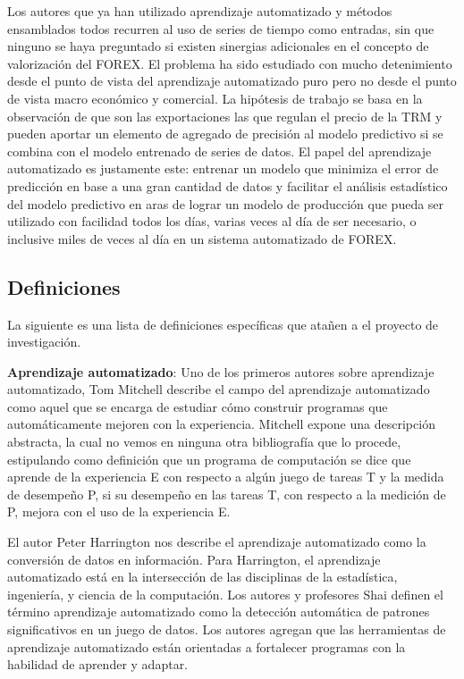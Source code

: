 Los autores que ya han utilizado aprendizaje automatizado y métodos ensamblados todos recurren al uso de series de tiempo como entradas, sin que ninguno se haya preguntado si existen sinergias adicionales en el concepto de valorización del FOREX. El problema ha sido estudiado con mucho detenimiento desde el punto de vista del aprendizaje automatizado puro pero no desde el punto de vista macro económico y comercial. La hipótesis de trabajo se basa en la observación de que son las exportaciones las que regulan el precio de la TRM y pueden aportar un elemento de agregado de precisión al modelo predictivo si se combina con el modelo entrenado de series de datos. El papel del aprendizaje automatizado es justamente este: entrenar un modelo que minimiza el error de predicción en base a una gran cantidad de datos y facilitar el análisis estadístico del modelo predictivo en aras de lograr un modelo de producción que pueda ser utilizado con facilidad todos los días, varias veces al día de ser necesario, o inclusive miles de veces al día en un sistema automatizado de FOREX. 

\subsection{Definiciones}
La siguiente es una lista de definiciones específicas que atañen a el proyecto de investigación.
 
\textbf{Aprendizaje automatizado}: Uno de los primeros autores sobre aprendizaje automatizado, Tom Mitchell \cite{mitchell} describe el campo del aprendizaje automatizado como aquel que se encarga de estudiar cómo construir programas que automáticamente mejoren con la experiencia. Mitchell expone una descripción abstracta, la cual no vemos en ninguna otra bibliografía que lo procede, estipulando como definición que un programa de computación se dice que aprende de la experiencia E con respecto a algún juego de tareas T y la medida de desempeño P, si su desempeño en las tareas T, con respecto a la medición de P, mejora con el uso de la experiencia E.
 
El autor Peter Harrington \cite{harrington} nos describe el aprendizaje automatizado como la conversión de datos en información. Para Harrington, el aprendizaje automatizado está en la intersección de las disciplinas de la estadística, ingeniería, y ciencia de la computación. Los autores y profesores Shai \cite{shaiShai} definen el término aprendizaje automatizado como la detección automática de patrones significativos en un juego de datos. Los autores agregan que las herramientas de aprendizaje automatizado están orientadas a fortalecer programas con la habilidad de aprender y adaptar.
 
